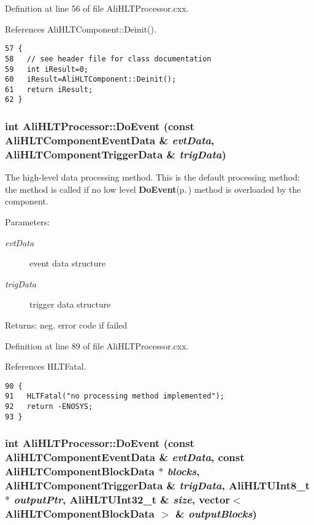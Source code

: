 Definition at line 56 of file Ali\-HLTProcessor.cxx.

References Ali\-HLTComponent::Deinit().

\footnotesize\begin{verbatim}57 {
58   // see header file for class documentation
59   int iResult=0;
60   iResult=AliHLTComponent::Deinit();
61   return iResult;
62 }
\end{verbatim}\normalsize 


\subsubsection{\setlength{\rightskip}{0pt plus 5cm}int Ali\-HLTProcessor::Do\-Event (const {\bf Ali\-HLTComponent\-Event\-Data} \& {\em evt\-Data}, {\bf Ali\-HLTComponent\-Trigger\-Data} \& {\em trig\-Data})\hspace{0.3cm}{\tt  [private, virtual]}}\label{classAliHLTProcessor_d1}


The high-level data processing method. This is the default processing method; the method is called if no low level {\bf Do\-Event}{\rm (p.\,\pageref{classAliHLTProcessor_d0})} method is overloaded by the component. \begin{Desc}
\item[Parameters:]
\begin{description}
\item[{\em evt\-Data}]event data structure \item[{\em trig\-Data}]trigger data structure \end{description}
\end{Desc}
\begin{Desc}
\item[Returns:]neg. error code if failed \end{Desc}


Definition at line 89 of file Ali\-HLTProcessor.cxx.

References HLTFatal.

\footnotesize\begin{verbatim}90 {
91   HLTFatal("no processing method implemented");
92   return -ENOSYS;
93 }
\end{verbatim}\normalsize 


\subsubsection{\setlength{\rightskip}{0pt plus 5cm}int Ali\-HLTProcessor::Do\-Event (const {\bf Ali\-HLTComponent\-Event\-Data} \& {\em evt\-Data}, const {\bf Ali\-HLTComponent\-Block\-Data} $\ast$ {\em blocks}, {\bf Ali\-HLTComponent\-Trigger\-Data} \& {\em trig\-Data}, {\bf Ali\-HLTUInt8\_\-t} $\ast$ {\em output\-Ptr}, {\bf Ali\-HLTUInt32\_\-t} \& {\em size}, vector$<$ {\bf Ali\-HLTComponent\-Block\-Data} $>$ \& {\em output\-Blocks})\hspace{0.3cm}{\tt  [private, virtual]}}\label{classAliHLTProcessor_d0}


